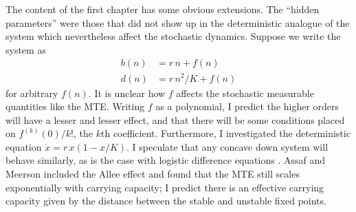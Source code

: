 The content of the first chapter has some obvious extensions. 
The ``hidden parameters'' were those that did not show up in the deterministic analogue of the system which nevertheless affect the stochastic dynamics. 
Suppose we write the system as
\begin{align*}
	b(n) &= r\,n + f(n) \\
	d(n) &= r\,n^2/K + f(n)
\end{align*}
for arbitrary $f(n)$. It is unclear how $f$ affects the stochastic measurable quantities like the MTE. 
Writing $f$ as a polynomial, I predict the higher orders will have a lesser and lesser effect, and that there will be some conditions placed on $f^{(k)}(0)/k!$, the $k$th coefficient. 
Furthermore, I investigated the deterministic equation $\dot{x} = r\,x(1-x/K)$. I speculate that any concave down system will behave similarly, as is the case with logistic difference equations \cite{Strogatz1994}. 
Assaf and Meerson \cite{Assaf2016} included the Allee effect and found that the MTE still scales exponentially with carrying capacity; I predict there is an effective carrying capacity given by the distance between the stable and unstable fixed points. 

